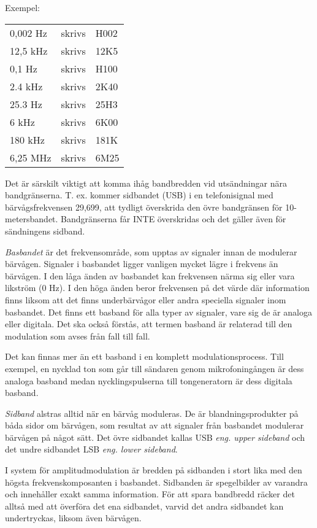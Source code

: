 Exempel:\\
\begin{tabular}{lll}
	0,002 Hz & skrivs & H002\\
	12,5 kHz & skrivs & 12K5\\
	0,1 Hz & skrivs & H100\\ 
	2.4 kHz & skrivs & 2K40\\
	25.3 Hz & skrivs & 25H3\\
	6 kHz & skrivs & 6K00\\
	180 kHz & skrivs & 181K\\
	6,25 MHz & skrivs & 6M25\\
\end{tabular}

Det är särskilt viktigt att komma ihåg bandbredden vid utsändningar nära
bandgränserna. T. ex. kommer sidbandet (USB) i en telefonisignal med
bärvågsfrekvensen 29,699, att tydligt överskrida den övre bandgränsen för
10-metersbandet. Bandgränserna får INTE överskridas och det gäller även för
sändningens sidband.

\emph{Basbandet} är det frekvensområde, som upptas av signaler innan de
modulerar bärvågen. Signaler i basbandet ligger vanligen mycket lägre i
frekvens än bärvågen. I den låga änden av basbandet kan frekvensen närma sig
eller vara likström (0 Hz). I den höga änden beror frekvensen på det värde där
information finns liksom att det finns underbärvågor eller andra speciella
signaler inom basbandet. Det finns ett basband för alla typer av signaler, vare
sig de är analoga eller digitala. Det ska också förstås, att termen basband är
relaterad till den modulation som avses från fall till fall.

Det kan finnas mer än ett basband i en komplett modulationsprocess. Till
exempel, en nycklad ton som går till sändaren genom mikrofoningången är dess
analoga basband medan nycklingspulserna till tongeneratorn är dess digitala
basband.

\emph{Sidband} alstras alltid när en bärvåg moduleras. De är blandningsprodukter
på båda sidor om bärvågen, som resultat av att signaler från basbandet modulerar
bärvågen på något sätt. Det övre sidbandet kallas USB \emph{eng. upper sideband}
och det undre sidbandet LSB \emph{eng. lower sideband}.

I system för amplitudmodulation är bredden på sidbanden i stort lika med den
högsta frekvenskomposanten i basbandet. Sidbanden är spegelbilder av varandra
och innehåller exakt samma information. För att spara bandbredd räcker det
alltså med att överföra det ena sidbandet, varvid det andra sidbandet kan
undertryckas, liksom även bärvågen.

